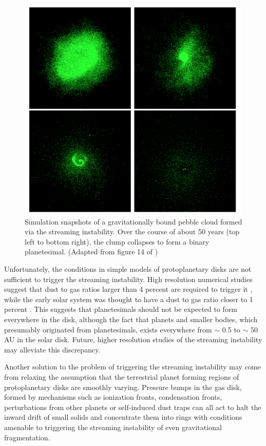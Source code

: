 \begin{figure}
\begin{center}
    \includegraphics[width=\textwidth]{figures/intro/binaryPl.png}
    \caption{Simulation snapshots of a gravitationally bound pebble cloud formed via the streaming instability. Over the course of about 50 years (top left to bottom right), the clump collapses to form a binary planetesimal. (Adapted from figure 14 of \cite{nesvorny21})\label{fig:plCollapse}}
\end{center}
\end{figure}
 
Unfortunately, the conditions in simple models of protoplanetary disks are not sufficient to trigger the streaming instability. High resolution numerical studies suggest that dust to gas ratios larger than 4 percent are required to trigger it \cite{carrera15, yang17}, while the early solar system was thought to have a dust to gas ratio closer to 1 percent \cite{hayashi81}. This suggests that planetesimals should not be expected to form everywhere in the disk, although the fact that planets and smaller bodies, which presumably originated from planetesimals, exists everywhere from $\sim$ 0.5 to $\sim$ 50 AU in the solar disk. Future, higher resolution studies of the streaming instability may alleviate this discrepancy.

Another solution to the problem of triggering the streaming instability may come from relaxing the assumption that the terrestrial planet forming regions of protoplanetary disks are smoothly varying. Pressure bumps in the gas disk, formed by mechanisms such as ionization fronts, condensation fronts, perturbations from other planets or self-induced dust traps \cite{gonzalez17} can all act to halt the inward drift of small solids and concentrate them into rings with conditions amenable to triggering the streaming instability of even gravitational fragmentation.

